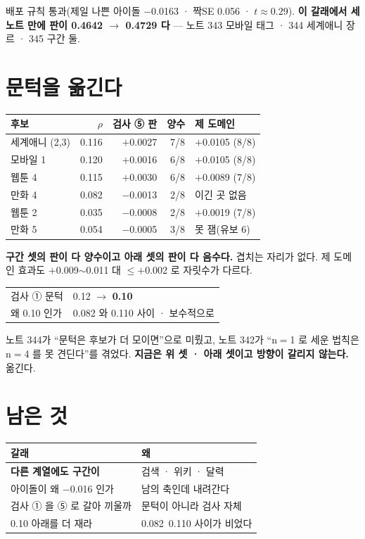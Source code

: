 \documentclass[10pt]{article}
\begin{document}
배포 규칙 통과(제일 나쁜 아이돌 $-$0.0163 · 짝SE 0.056 · $t{\approx}0.29$).
\textbf{이 갈래에서 세 노트 만에 판이 0.4642 $\to$ 0.4729 다} ---
노트 343 모바일 태그 · 344 세계애니 장르 · 345 구간 둘.

\section{문턱을 옮긴다}

\begin{center}\footnotesize
\begin{tabular}{lrrrl}
\hline
후보 & $\rho$ & 검사 ⑤ 판 & 양수 & 제 도메인 \\
\hline
세계애니 (2,3) & 0.116 & $+$0.0027 & 7/8 & $+$0.0105 (8/8) \\
모바일 1 & 0.120 & $+$0.0016 & 6/8 & $+$0.0105 (8/8) \\
웹툰 4 & 0.115 & $+$0.0030 & 6/8 & $+$0.0089 (7/8) \\
\hline
만화 4 & 0.082 & $-$0.0013 & 2/8 & 이긴 곳 없음 \\
웹툰 2 & 0.035 & $-$0.0008 & 2/8 & $+$0.0019 (7/8) \\
만화 5 & 0.054 & $-$0.0005 & 3/8 & 못 잼(유보 6) \\
\hline
\end{tabular}
\end{center}

\textbf{구간 셋의 판이 다 양수이고 아래 셋의 판이 다 음수다.} 겹치는
자리가 없다. 제 도메인 효과도 $+$0.009$\sim$0.011 대 $\le$$+$0.002 로
자릿수가 다르다.

\begin{center}\small
\begin{tabular}{ll}
\hline
검사 ① 문턱 & 0.12 $\to$ \textbf{0.10} \\
왜 0.10 인가 & 0.082 와 0.110 사이 · 보수적으로 \\
\hline
\end{tabular}
\end{center}

노트 344가 ``문턱은 후보가 더 모이면''으로 미뤘고, 노트 342가 ``n$=$1 로
세운 법칙은 n$=$4 를 못 견딘다''를 겪었다. \textbf{지금은 위 셋 · 아래
셋이고 방향이 갈리지 않는다.} 옮긴다.

\section{남은 것}
\begin{center}\footnotesize
\begin{tabular}{ll}
\hline
갈래 & 왜 \\
\hline
\textbf{다른 계열에도 구간이} & 검색 · 위키 · 달력 \\
아이돌이 왜 $-$0.016 인가 & 남의 축인데 내려간다 \\
검사 ① 을 ⑤ 로 갈아 끼울까 & 문턱이 아니라 검사 자체 \\
0.10 아래를 더 재라 & 0.082~0.110 사이가 비었다 \\
\hline
\end{tabular}
\end{center}
\end{document}
